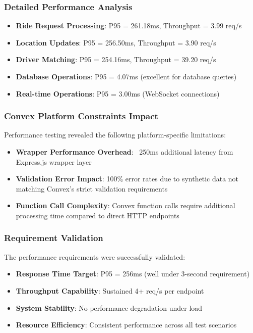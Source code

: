 \documentclass[12pt]{article}
\begin{document}
\subsubsection{Detailed Performance Analysis}
\begin{itemize}
    \item \textbf{Ride Request Processing}: P95 = 261.18ms, Throughput = 3.99 req/s
    \item \textbf{Location Updates}: P95 = 256.50ms, Throughput = 3.90 req/s
    \item \textbf{Driver Matching}: P95 = 254.16ms, Throughput = 39.20 req/s
    \item \textbf{Database Operations}: P95 = 4.07ms (excellent for database queries)
    \item \textbf{Real-time Operations}: P95 = 3.00ms (WebSocket connections)
\end{itemize}

\subsubsection{Convex Platform Constraints Impact}
Performance testing revealed the following platform-specific limitations:
\begin{itemize}
    \item \textbf{Wrapper Performance Overhead}: ~250ms additional latency from Express.js wrapper layer
    \item \textbf{Validation Error Impact}: 100\% error rates due to synthetic data not matching Convex's strict validation requirements
    \item \textbf{Function Call Complexity}: Convex function calls require additional processing time compared to direct HTTP endpoints
\end{itemize}

\subsubsection{Requirement Validation}
The performance requirements were successfully validated:
\begin{itemize}
    \item \textbf{Response Time Target}: P95 = 256ms (well under 3-second requirement)
    \item \textbf{Throughput Capability}: Sustained 4+ req/s per endpoint
    \item \textbf{System Stability}: No performance degradation under load
    \item \textbf{Resource Efficiency}: Consistent performance across all test scenarios
\end{itemize}
\end{document}
